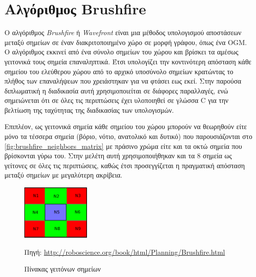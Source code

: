 \section{Αλγόριθμος Brushfire}
\label{section:brushfire_theory}

Ο αλγόριθμος \emph{Brushfire} ή \emph{Wavefront} είναι μια μέθοδος υπολογισμού  αποστάσεων μεταξύ σημείων σε έναν διακριτοποιημένο χώρο σε μορφή γράφου, όπως ένα OGM. Ο αλγόριθμος εκκινεί από ένα σύνολο σημείων του χώρου και βρίσκει τα αμέσως γειτονικά τους σημεία επαναληπτικά. Έτσι υπολογίζει την κοντινότερη απόσταση κάθε σημείου του ελεύθερου χώρου από το αρχικό υποσύνολο σημείων κρατώντας το πλήθος των επαναλήψεων που χρειάστηκαν για να φτάσει εως εκεί. Στην παρούσα διπλωματική η διαδικασία αυτή χρησιμοποιείται σε διάφορες παραλλαγές, ενώ σημειώνεται ότι σε όλες τις περιπτώσεις έχει υλοποιηθεί σε γλώσσα C για την βελτίωση της ταχύτητας της διαδικασίας των υπολογισμών. 

Επιπλέον, ως γειτονικά σημεία κάθε σημείου του χώρου μπορούν να θεωρηθούν είτε μόνο τα τέσσερα σημεία (βόριο, νότιο, ανατολικό και δυτικό) που παρουσιάζονται στο \autoref{fig:brushfire_neighbors_matrix} με πράσινο χρώμα είτε και τα οκτώ σημεία που βρίσκονται γύρω του. Στην μελέτη αυτή χρησιμοποιήθηκαν και τα 8 σημεία ως γείτονες σε όλες τις περιπτώσεις, καθώς έτσι προσεγγίζεται η πραγματική απόσταση μεταξύ σημείων με μεγαλύτερη ακρίβεια.

\begin{figure}[!htb]
    \centering
    \includegraphics[width=0.3\textwidth]{./images/chapter3/neighbors2.png}
    \caption{Πίνακας γειτόνων σημείων}
    Πηγή: \href{http://roboscience.org/book/html/Planning/Brushfire.html}{http://roboscience.org/book/html/Planning/Brushfire.html}
    \label{fig:brushfire_neighbors_matrix}
\end{figure}

